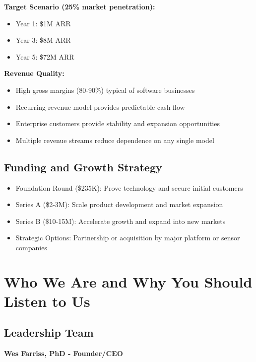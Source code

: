 \documentclass[11pt,letterpaper]{article}
\begin{document}
\textbf{Target Scenario (25\% market penetration):}
\begin{itemize}[leftmargin=10pt, itemsep=1pt]
    \item Year 1: \$1M ARR
    \item Year 3: \$8M ARR
    \item Year 5: \$72M ARR
\end{itemize}

\textbf{Revenue Quality:}
\begin{itemize}[leftmargin=10pt, itemsep=1pt]
    \item High gross margins (80-90\%) typical of software businesses
    \item Recurring revenue model provides predictable cash flow
    \item Enterprise customers provide stability and expansion opportunities
    \item Multiple revenue streams reduce dependence on any single model
\end{itemize}

\subsection*{Funding and Growth Strategy}

\begin{itemize}[leftmargin=10pt, itemsep=1pt]
    \item Foundation Round (\$235K): Prove technology and secure initial customers
    \item Series A (\$2-3M): Scale product development and market expansion
    \item Series B (\$10-15M): Accelerate growth and expand into new markets
    \item Strategic Options: Partnership or acquisition by major platform or sensor companies
\end{itemize}

\section*{Who We Are and Why You Should Listen to Us}

\subsection*{Leadership Team}

\textbf{Wes Farriss, PhD - Founder/CEO}
\end{document}
